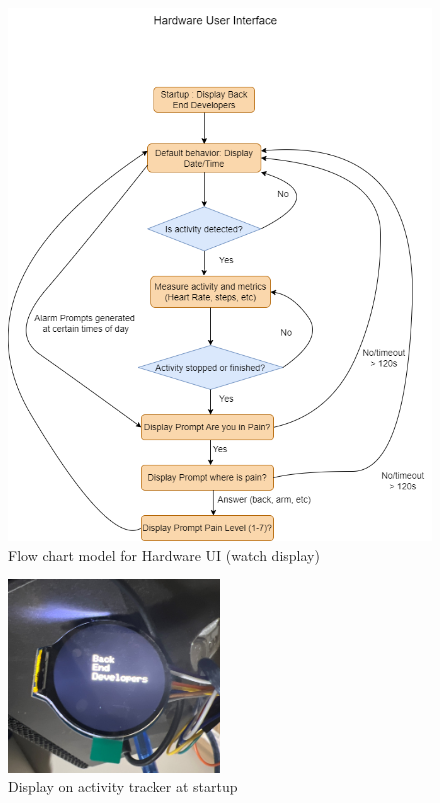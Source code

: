 \documentclass[12pt, titlepage]{article}
\begin{document}
\begin{figure}[H]
	\begin{center}
		 \includegraphics[width=1\textwidth]{HardwareUI_FSM}
		\caption{Flow chart model for Hardware UI (watch display)}
		\label{HardwareUI_FSM} 
	\end{center}
\end{figure}

\begin{figure}[H]
	\begin{center}
		 \includegraphics[width=0.5\textwidth]{BEDDisplay}
		\caption{Display on activity tracker at startup}
		\label{BEDDisplay} 
	\end{center}
\end{figure}
\end{document}
